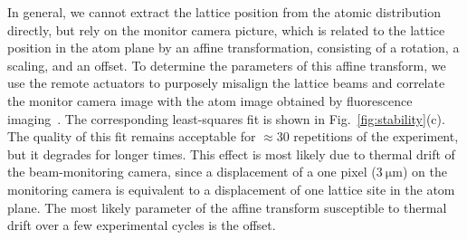 \documentclass[twocolumn,aip,rsi,reprint,bibnotes]{revtex4-1}
\newcommand\unit[2]{\ensuremath{#1~\mathrm{{#2}}}}
\begin{document}
In general, we cannot extract the lattice position from the atomic distribution directly, but rely on the monitor camera picture, which is related to the lattice position in the atom plane by an affine transformation, consisting of a rotation, a scaling, and an offset.
To determine the parameters of this affine transform, we use the remote actuators to purposely misalign the lattice beams and correlate the monitor camera image with the atom image obtained by fluorescence imaging~\cite{Parsons2015}.
The corresponding least-squares fit is shown in Fig.~\ref{fig:stability}(c).
The quality of this fit remains acceptable for $\approx$30 repetitions of the experiment, but it degrades for longer times.
This effect is most likely due to thermal drift of the beam-monitoring camera, since a displacement of a one pixel (\unit{3}{\mu{}m}) on the monitoring camera is equivalent to a displacement of one lattice site in the atom plane.
The most likely parameter of the affine transform susceptible to thermal drift over a few experimental cycles is the offset.
\end{document}

